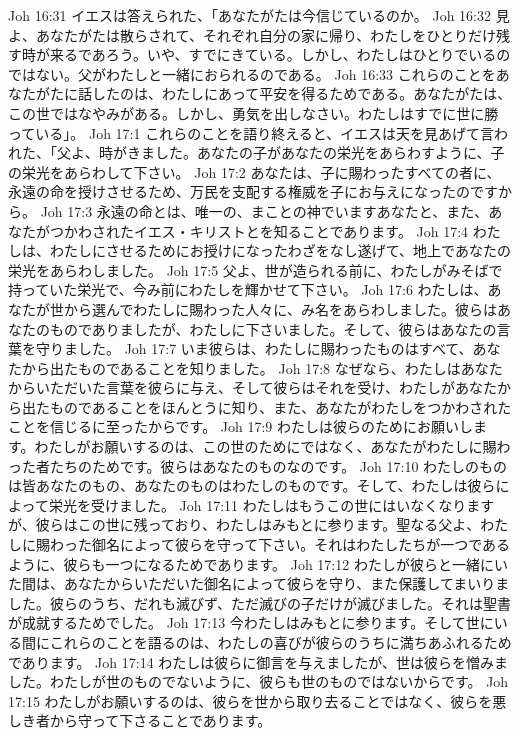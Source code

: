 Joh 16:31  イエスは答えられた、「あなたがたは今信じているのか。
Joh 16:32  見よ、あなたがたは散らされて、それぞれ自分の家に帰り、わたしをひとりだけ残す時が来るであろう。いや、すでにきている。しかし、わたしはひとりでいるのではない。父がわたしと一緒におられるのである。
Joh 16:33  これらのことをあなたがたに話したのは、わたしにあって平安を得るためである。あなたがたは、この世ではなやみがある。しかし、勇気を出しなさい。わたしはすでに世に勝っている」。
Joh 17:1  これらのことを語り終えると、イエスは天を見あげて言われた、「父よ、時がきました。あなたの子があなたの栄光をあらわすように、子の栄光をあらわして下さい。
Joh 17:2  あなたは、子に賜わったすべての者に、永遠の命を授けさせるため、万民を支配する権威を子にお与えになったのですから。
Joh 17:3  永遠の命とは、唯一の、まことの神でいますあなたと、また、あなたがつかわされたイエス・キリストとを知ることであります。
Joh 17:4  わたしは、わたしにさせるためにお授けになったわざをなし遂げて、地上であなたの栄光をあらわしました。
Joh 17:5  父よ、世が造られる前に、わたしがみそばで持っていた栄光で、今み前にわたしを輝かせて下さい。
Joh 17:6  わたしは、あなたが世から選んでわたしに賜わった人々に、み名をあらわしました。彼らはあなたのものでありましたが、わたしに下さいました。そして、彼らはあなたの言葉を守りました。
Joh 17:7  いま彼らは、わたしに賜わったものはすべて、あなたから出たものであることを知りました。
Joh 17:8  なぜなら、わたしはあなたからいただいた言葉を彼らに与え、そして彼らはそれを受け、わたしがあなたから出たものであることをほんとうに知り、また、あなたがわたしをつかわされたことを信じるに至ったからです。
Joh 17:9  わたしは彼らのためにお願いします。わたしがお願いするのは、この世のためにではなく、あなたがわたしに賜わった者たちのためです。彼らはあなたのものなのです。
Joh 17:10  わたしのものは皆あなたのもの、あなたのものはわたしのものです。そして、わたしは彼らによって栄光を受けました。
Joh 17:11  わたしはもうこの世にはいなくなりますが、彼らはこの世に残っており、わたしはみもとに参ります。聖なる父よ、わたしに賜わった御名によって彼らを守って下さい。それはわたしたちが一つであるように、彼らも一つになるためであります。
Joh 17:12  わたしが彼らと一緒にいた間は、あなたからいただいた御名によって彼らを守り、また保護してまいりました。彼らのうち、だれも滅びず、ただ滅びの子だけが滅びました。それは聖書が成就するためでした。
Joh 17:13  今わたしはみもとに参ります。そして世にいる間にこれらのことを語るのは、わたしの喜びが彼らのうちに満ちあふれるためであります。
Joh 17:14  わたしは彼らに御言を与えましたが、世は彼らを憎みました。わたしが世のものでないように、彼らも世のものではないからです。
Joh 17:15  わたしがお願いするのは、彼らを世から取り去ることではなく、彼らを悪しき者から守って下さることであります。

